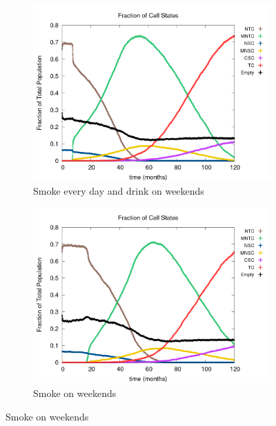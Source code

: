 \documentclass[\main/thesis.tex]{subfiles}
\begin{document}
\begin{figure}[H]
    \centering
    \begin{subfigure}[t]{.6\textwidth}
      \centering
      \includegraphics[width=\textwidth]{images/4_CarcinFunc/Fig8/numState_all_SmokeEveryday_DrinkWeekends.png}
      \caption{Smoke every day and drink on weekends}
      \label{fig:CarcinFunc_numState_SmokeEveryday_DrinkWeekends}
    \end{subfigure}
    \begin{subfigure}[t]{.6\textwidth}
      \centering
      \includegraphics[width=\textwidth]{images/4_CarcinFunc/Fig8/numState_all_SmokeWeekends.png}
      \caption{Smoke on weekends}
      \label{fig:CarcinFunc_numState_SmokeWeekends}
    \end{subfigure}

\end{figure}
\end{document}
